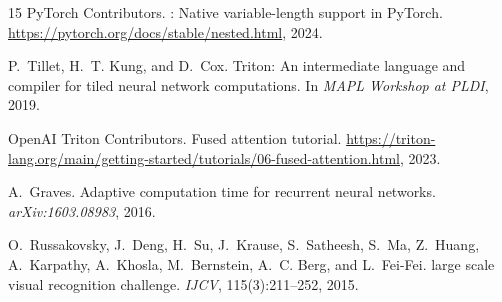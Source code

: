 \documentclass[conference]{IEEEtran}
\begin{document}
{\begin{thebibliography}{15}
{PyTorch Contributors}.
: Native variable-length support in {PyTorch}.
\newblock \url{https://pytorch.org/docs/stable/nested.html}, 2024.

P.~Tillet, H.~T. Kung, and D.~Cox.
\newblock Triton: An intermediate language and compiler for tiled
  neural network computations.
\newblock In \emph{MAPL Workshop at PLDI}, 2019.

{OpenAI Triton Contributors}.
\newblock Fused attention tutorial.
\newblock \url{https://triton-lang.org/main/getting-started/tutorials/06-fused-attention.html}, 2023.

A.~Graves.
\newblock Adaptive computation time for recurrent neural networks.
\newblock \emph{arXiv:1603.08983}, 2016.

O.~Russakovsky, J.~Deng, H.~Su, J.~Krause, S.~Satheesh,
S.~Ma, Z.~Huang, A.~Karpathy, A.~Khosla, M.~Bernstein,
A.~C. Berg, and L.~Fei-Fei.
 large scale visual recognition challenge.
\newblock \emph{IJCV}, 115(3):211--252, 2015.

\end{thebibliography}
}
\end{document}
